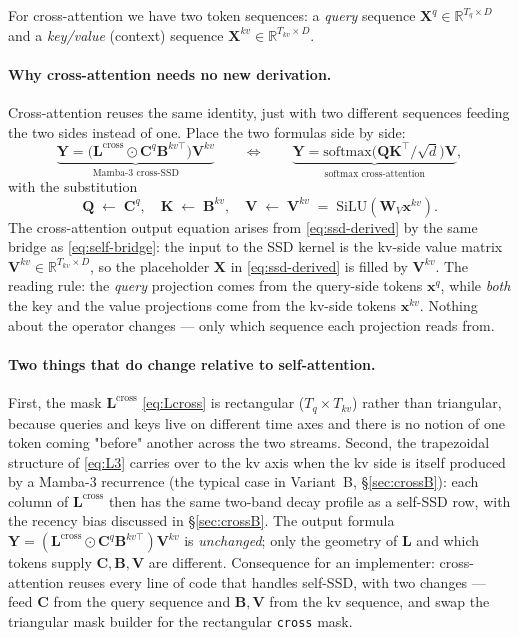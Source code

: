 \documentclass[11pt,a4paper]{article}
\begin{document}
For cross-attention we have two token sequences: a \emph{query}
sequence $\bm{X}^{q}\in\mathbb{R}^{T_q\times D}$ and a \emph{key/value}
(context) sequence $\bm{X}^{kv}\in\mathbb{R}^{T_{kv}\times D}$.

\paragraph{Why cross-attention needs no new derivation.}
Cross-attention reuses the same identity, just with two different
sequences feeding the two sides instead of one. Place the two
formulas side by side:
\[
  \underbrace{\bm{Y} = \bigl(\bm{L}^{\text{cross}}\odot\bm{C}^q\bm{B}^{kv\top}\bigr)\bm{V}^{kv}}_{\text{Mamba-3 cross-SSD}}
  \qquad\Longleftrightarrow\qquad
  \underbrace{\bm{Y} = \mathrm{softmax}\!\bigl(\bm{Q}\bm{K}^\top/\sqrt{d}\bigr)\bm{V}}_{\text{softmax cross-attention}},
\]
with the substitution
\[
  \bm{Q} \;\leftarrow\; \bm{C}^q, \quad
  \bm{K} \;\leftarrow\; \bm{B}^{kv}, \quad
  \bm{V} \;\leftarrow\; \bm{V}^{kv} \;=\; \mathrm{SiLU}(\bm{W}_V \bm{x}^{kv}).
\]
The cross-attention output equation arises from
\eqref{eq:ssd-derived} by the same bridge as
\eqref{eq:self-bridge}: the input to the SSD kernel is the kv-side
value matrix
$\bm{V}^{kv}\in\mathbb{R}^{T_{kv}\times D}$, so the placeholder
$\bm{X}$ in \eqref{eq:ssd-derived} is filled by $\bm{V}^{kv}$.
The reading rule: the \emph{query} projection comes from the
query-side tokens $\bm{x}^{q}$, while \emph{both} the key and the
value projections come from the kv-side tokens $\bm{x}^{kv}$.
Nothing about the operator changes — only which sequence each
projection reads from.

\paragraph{Two things that do change relative to self-attention.}
First, the mask $\bm{L}^{\text{cross}}$ \eqref{eq:Lcross} is
rectangular ($T_q \times T_{kv}$) rather than triangular, because
queries and keys live on different time axes and there is no notion
of one token coming "before" another across the two streams.
Second, the trapezoidal structure of \eqref{eq:L3} carries over to
the kv axis when the kv side is itself produced by a Mamba-3
recurrence (the typical case in Variant~B, \S\ref{sec:crossB}): each
column of $\bm{L}^{\text{cross}}$ then has the same two-band decay
profile as a self-SSD row, with the recency bias discussed in
\S\ref{sec:crossB}. The output formula $\bm{Y} =
(\bm{L}^{\text{cross}}\odot\bm{C}^q\bm{B}^{kv\top})\bm{V}^{kv}$ is
\emph{unchanged}; only the geometry of $\bm{L}$ and which tokens
supply $\bm{C}, \bm{B}, \bm{V}$ are different. Consequence for an
implementer: cross-attention reuses every line of code that handles
self-SSD, with two changes — feed $\bm{C}$ from the query sequence
and $\bm{B}, \bm{V}$ from the kv sequence, and swap the
triangular mask builder for the rectangular \texttt{cross} mask.
\end{document}
